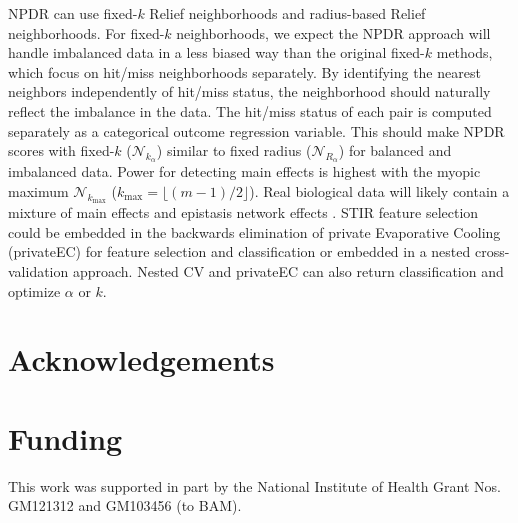 \documentclass[10pt]{article}
\begin{document}
NPDR can use fixed-$k$ Relief neighborhoods and radius-based Relief neighborhoods. For fixed-$k$ neighborhoods, we expect the NPDR approach will handle imbalanced data in a less biased way than the original fixed-$k$ methods, which focus on hit/miss neighborhoods separately. By identifying the nearest neighbors independently of hit/miss status, the neighborhood should naturally reflect the imbalance in the data. The hit/miss status of each pair is computed separately as a categorical outcome regression variable. This should make NPDR scores with fixed-$k$ ($\mathcal{N}_{k_\alpha}$) similar to fixed radius ($\mathcal{N}_{R_\alpha}$) for balanced and imbalanced data. Power for detecting main effects is highest with the myopic maximum $\mathcal{N}_{k_\text{max}}$ ($k_{\text{max}}=\lfloor (m-1)/2\rfloor$). Real biological data will likely contain a mixture of main effects and epistasis network effects \cite{mckinney_pajewski}. STIR feature selection could be embedded in the backwards elimination of private Evaporative Cooling (privateEC) for feature selection and classification \cite{le17} or embedded in a nested cross-validation approach. Nested CV and privateEC can also return classification and optimize $\alpha$ or $k$. 

\section*{Acknowledgements}

\section*{Funding}
This work was supported in part by the National Institute of Health Grant Nos. GM121312 and GM103456 (to BAM). 


%

\end{document}

